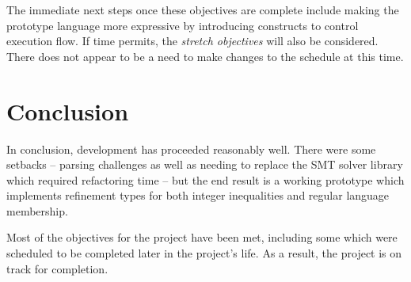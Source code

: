 \documentclass[a4paper]{article}
\begin{document}
The immediate next steps once these objectives are complete include making the prototype language more expressive by introducing constructs to control execution flow. If time permits, the \emph{stretch objectives} will also be considered. There does not appear to be a need to make changes to the schedule at this time.


\section{Conclusion}

In conclusion, development has proceeded reasonably well. There were some setbacks -- parsing challenges as well as needing to replace the SMT solver library which required refactoring time -- but the end result is a working prototype which implements refinement types for both integer inequalities and regular language membership.

Most of the objectives for the project have been met, including some which were scheduled to be completed later in the project's life. As a result, the project is on track for completion.





\end{document}

